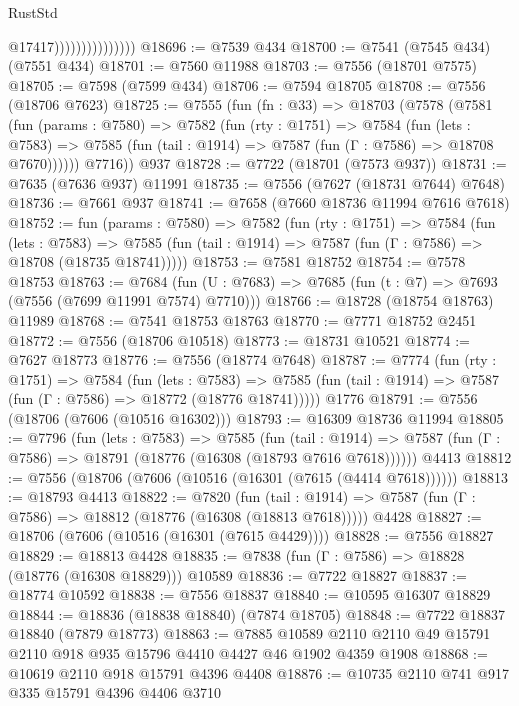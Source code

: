\begin{lexlean}{RustStd}
\begin{coremodule}
                                  @17417)))))))))))))))
@18696 := @7539 @434
@18700 := @7541 (@7545 @434) (@7551 @434)
@18701 := @7560 @11988
@18703 := @7556 (@18701 @7575)
@18705 := @7598 (@7599 @434)
@18706 := @7594 @18705
@18708 := @7556 (@18706 @7623)
@18725 := @7555
    (fun (fn : @33) =>
    @18703
      (@7578
        (@7581
          (fun (params : @7580) =>
          @7582
            (fun (rty : @1751) =>
            @7584
              (fun (lets : @7583) =>
              @7585 (fun (tail : @1914) => @7587 (fun (Γ : @7586) => @18708 @7670))))))
        @7716))
    @937
@18728 := @7722 (@18701 (@7573 @937))
@18731 := @7635 (@7636 @937) @11991
@18735 := @7556 (@7627 (@18731 @7644) @7648)
@18736 := @7661 @937
@18741 := @7658 (@7660 @18736 @11994 @7616 @7618)
@18752 := fun (params : @7580) =>
  @7582
    (fun (rty : @1751) =>
    @7584
      (fun (lets : @7583) =>
      @7585 (fun (tail : @1914) => @7587 (fun (Γ : @7586) => @18708 (@18735 @18741)))))
@18753 := @7581 @18752
@18754 := @7578 @18753
@18763 := @7684
    (fun (U : @7683) => @7685 (fun (t : @7) => @7693 (@7556 (@7699 @11991 @7574) @7710)))
@18766 := @18728 (@18754 @18763) @11989
@18768 := @7541 @18753 @18763
@18770 := @7771 @18752 @2451
@18772 := @7556 (@18706 @10518)
@18773 := @18731 @10521
@18774 := @7627 @18773
@18776 := @7556 (@18774 @7648)
@18787 := @7774
    (fun (rty : @1751) =>
    @7584
      (fun (lets : @7583) =>
      @7585 (fun (tail : @1914) => @7587 (fun (Γ : @7586) => @18772 (@18776 @18741)))))
    @1776
@18791 := @7556 (@18706 (@7606 (@10516 @16302)))
@18793 := @16309 @18736 @11994
@18805 := @7796
    (fun (lets : @7583) =>
    @7585
      (fun (tail : @1914) =>
      @7587 (fun (Γ : @7586) => @18791 (@18776 (@16308 (@18793 @7616 @7618))))))
    @4413
@18812 := @7556 (@18706 (@7606 (@10516 (@16301 (@7615 (@4414 @7618))))))
@18813 := @18793 @4413
@18822 := @7820
    (fun (tail : @1914) => @7587 (fun (Γ : @7586) => @18812 (@18776 (@16308 (@18813 @7618)))))
    @4428
@18827 := @18706 (@7606 (@10516 (@16301 (@7615 @4429))))
@18828 := @7556 @18827
@18829 := @18813 @4428
@18835 := @7838 (fun (Γ : @7586) => @18828 (@18776 (@16308 @18829))) @10589
@18836 := @7722 @18827
@18837 := @18774 @10592
@18838 := @7556 @18837
@18840 := @10595 @16307 @18829
@18844 := @18836 (@18838 @18840) (@7874 @18705)
@18848 := @7722 @18837 @18840 (@7879 @18773)
@18863 := @7885
    @10589
    @2110
    @2110
    @49
    @15791
    @2110
    @918
    @935
    @15796
    @4410
    @4427
    @46
    @1902
    @4359
    @1908
@18868 := @10619 @2110 @918 @15791 @4396 @4408
@18876 := @10735 @2110 @741 @917 @335 @15791 @4396 @4406 @3710

\end{coremodule}
\end{lexlean}
